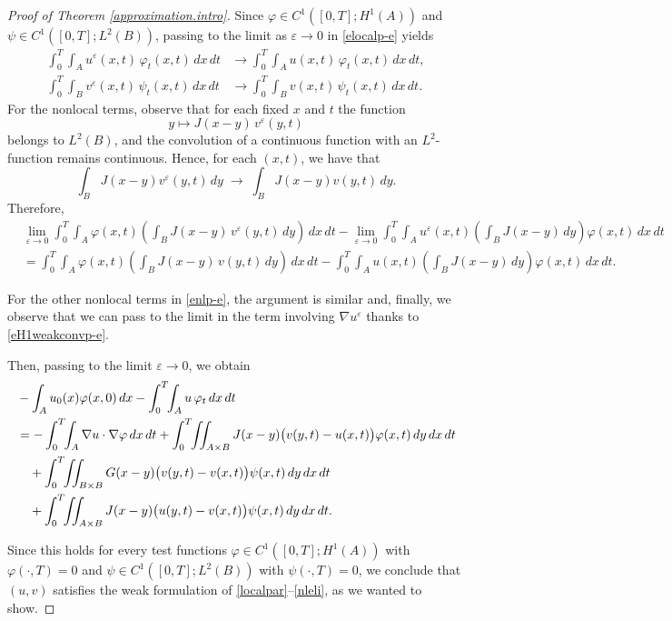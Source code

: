 \documentclass[10pt,a4paper]{amsart}
\begin{document}
\begin{proof}[Proof of Theorem \ref{approximation.intro}]
Since $\varphi\in C^1([0,T];H^1(A))$ and $\psi\in C^1([0,T];L^2(B))$, 
passing to the limit as $\varepsilon\to0$ in \eqref{elocalp-e} yields
\begin{align*}
\int_0^T\!\!\int_A u^\varepsilon(x,t)\,\varphi_t(x,t)\,dx\,dt
&\longrightarrow
\int_0^T\!\!\int_A u(x,t)\,\varphi_t(x,t)\,dx\,dt,\\[0.2em]
\int_0^T\!\!\int_B v^\varepsilon(x,t)\,\psi_t(x,t)\,dx\,dt
&\longrightarrow
\int_0^T\!\!\int_B v(x,t)\,\psi_t(x,t)\,dx\,dt.
\end{align*}
For the nonlocal terms, observe that for each fixed $x$ and $t$ the function
\[
y\mapsto J(x-y)\,v^\varepsilon(y,t)
\]
belongs to $L^2(B)$, and the convolution of a continuous function with an $L^2$-function 
remains continuous. Hence, for each $(x,t)$, we have that
\[
\int_B J(x-y)v^\varepsilon(y,t)\,dy \;\longrightarrow\;
\int_B J(x-y)v(y,t)\,dy.
\]
Therefore,
\begin{align*}
&\lim_{\varepsilon\to0}
\int_0^T\!\!\int_A 
\varphi(x,t)\left(\int_B J(x-y)\,v^\varepsilon(y,t)\,dy\right)\,dx\,dt
-
\lim_{\varepsilon\to0}
\int_0^T\!\!\int_A 
u^\varepsilon(x,t)\left(\int_B J(x-y)\,dy\right)\varphi(x,t)\,dx\,dt\\[0.4em]
&=
\int_0^T\!\!\int_A 
\varphi(x,t)\left(\int_B J(x-y)\,v(y,t)\,dy\right)\,dx\,dt
-
\int_0^T\!\!\int_A 
u(x,t)\left(\int_B J(x-y)\,dy\right)\varphi(x,t)\,dx\,dt.
\end{align*}


For the other nonlocal terms in \eqref{enlp-e}, the argument is similar and, finally, we observe that we can pass to the limit
in the term involving $\nabla u^\varepsilon$ thanks to \eqref{eH1weakconvp-e}. 

Then, passing to
the limit $\varepsilon\to 0$, we obtain
\begin{align}
&-\int_A u_0(x)\varphi(x,0)\,dx
-\int_0^T\!\!\int_A u\,\varphi_t\,dx\,dt
\notag\\
&=
-\int_0^T\!\!\int_A \nabla u\cdot\nabla\varphi\,dx\,dt
+\int_0^T\!\!\iint_{A\times B}
   J(x-y)\big( v(y,t)-u(x,t) \big)\varphi(x,t)\,dy\,dx\,dt
\notag\\
&\quad
+\int_0^T\!\!\iint_{B\times B}
   G(x-y)\big( v(y,t)-v(x,t) \big)\psi(x,t)\,dy\,dx\,dt
\notag\\
&\quad
+\int_0^T\!\!\iint_{A\times B}
   J(x-y)\big( u(y,t)-v(x,t) \big)\psi(x,t)\,dy\,dx\,dt.
\end{align}

Since this holds for every test functions
$\varphi\in C^1([0,T];H^1(A))$ with $\varphi(\cdot,T)=0$ and
$\psi\in C^1([0,T];L^2(B))$ with $\psi(\cdot,T)=0$, we conclude that
$(u,v)$ satisfies the weak formulation of \eqref{localpar}--\eqref{nleli},
as we wanted to show.
\end{proof}
\end{document}
